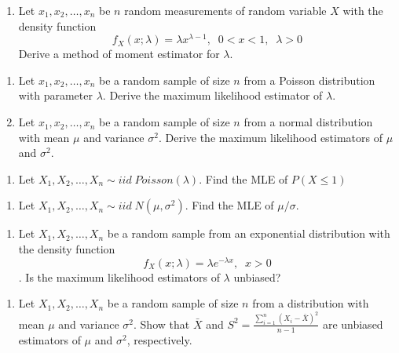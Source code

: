 \documentclass[]{book}
\providecommand{\tightlist}{%
  \setlength{\itemsep}{0pt}\setlength{\parskip}{0pt}}
\begin{document}
\begin{enumerate}
\def\labelenumi{\arabic{enumi}.}
\setcounter{enumi}{5}
\tightlist
\item
  Let \(x_1, x_2, \dots, x_n\) be \(n\) random measurements of random variable \(X\) with the density function
  \[f_X(x;\lambda)= \lambda x^{\lambda-1},\;\; 0<x<1, \;\; \lambda>0\]
  Derive a method of moment estimator for \(\lambda\).
\end{enumerate}

\begin{enumerate}
\def\labelenumi{\arabic{enumi}.}
\setcounter{enumi}{6}
\item
  Let \(x_1, x_2, \dots, x_n\) be a random sample of size \(n\) from a Poisson distribution with parameter \(\lambda\). Derive the maximum likelihood estimator of \(\lambda\).
\item
  Let \(x_1, x_2, \dots, x_n\) be a random sample of size \(n\) from a normal distribution with mean \(\mu\) and variance \(\sigma^2\). Derive the maximum likelihood estimators of \(\mu\) and \(\sigma^2\).
\end{enumerate}

\begin{enumerate}
\def\labelenumi{\arabic{enumi}.}
\setcounter{enumi}{8}
\tightlist
\item
  Let \(X_1, X_2, \dots, X_n \sim iid \; Poisson (\lambda)\). Find the MLE of \(P(X\leq 1)\)
\end{enumerate}

\begin{enumerate}
\def\labelenumi{\arabic{enumi}.}
\setcounter{enumi}{9}
\tightlist
\item
  Let \(X_1, X_2, \dots, X_n \sim iid \; N (\mu, \sigma^2)\). Find the MLE of \(\mu/\sigma\).
\end{enumerate}

\begin{enumerate}
\def\labelenumi{\arabic{enumi}.}
\setcounter{enumi}{10}
\tightlist
\item
  Let \(X_1, X_2, \dots, X_n\) be a random sample from an exponential distribution with the density function
  \[f_X(x;\lambda)= \lambda e^{-\lambda x},\;\; x>0\]. Is the maximum likelihood estimators of \(\lambda\) unbiased?
\end{enumerate}

\begin{enumerate}
\def\labelenumi{\arabic{enumi}.}
\setcounter{enumi}{11}
\tightlist
\item
  Let \(X_1, X_2, \dots, X_n\) be a random sample of size \(n\) from a distribution with mean \(\mu\) and variance \(\sigma^2\). Show that \(\bar{X}\) and \(S^2 = \frac{\sum_{i=1}^n(X_i-\bar{X})^2}{n-1}\) are unbiased estimators of \(\mu\) and \(\sigma^2\), respectively.
\end{enumerate}
\end{document}
